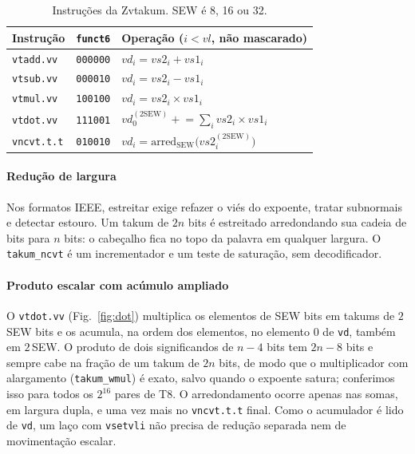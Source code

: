 \documentclass[conference]{IEEEtran}
\newcommand{\code}[1]{\texttt{#1}}
\begin{document}
\begin{table}[t]
\caption{Instruções da Zvtakum. SEW é 8, 16 ou 32.}
\label{tab:isa}
\centering
\begin{tabular}{@{}lll@{}}
\toprule
Instrução & \code{funct6} & Operação ($i<\mathit{vl}$, não mascarado)\\
\midrule
\code{vtadd.vv} & \code{000000} & $vd_i = vs2_i + vs1_i$\\
\code{vtsub.vv} & \code{000010} & $vd_i = vs2_i - vs1_i$\\
\code{vtmul.vv} & \code{100100} & $vd_i = vs2_i \times vs1_i$\\
\code{vtdot.vv} & \code{111001} & $vd_0^{(2\mathrm{SEW})} \mathrel{+}= \sum_i vs2_i \times vs1_i$\\
\code{vncvt.t.t} & \code{010010} & $vd_i = \mathrm{arred}_{\mathrm{SEW}}\bigl(vs2_i^{(2\mathrm{SEW})}\bigr)$\\
\bottomrule
\end{tabular}
\end{table}

\paragraph*{Redução de largura} Nos formatos IEEE, estreitar exige refazer o viés do expoente, tratar
subnormais e detectar estouro. Um takum de $2n$ bits é estreitado arredondando sua cadeia de bits para $n$
bits: o cabeçalho fica no topo da palavra em qualquer largura. O \code{takum\_ncvt} é um incrementador e
um teste de saturação, sem decodificador.

\paragraph*{Produto escalar com acúmulo ampliado} O \code{vtdot.vv} (Fig.~\ref{fig:dot}) multiplica os
elementos de SEW bits em takums de $2\,$SEW bits e os acumula, na ordem dos elementos, no elemento 0 de
\code{vd}, também em $2\,$SEW. O produto de dois significandos de $n-4$ bits tem $2n-8$ bits e sempre cabe
na fração de um takum de $2n$ bits, de modo que o multiplicador com alargamento (\code{takum\_wmul}) é
exato, salvo quando o expoente satura; conferimos isso para todos os $2^{16}$ pares de T8. O
arredondamento ocorre apenas nas somas, em largura dupla, e uma vez mais no \code{vncvt.t.t} final. Como o
acumulador é lido de \code{vd}, um laço com \code{vsetvli} não precisa de redução separada nem de
movimentação escalar.
\end{document}
